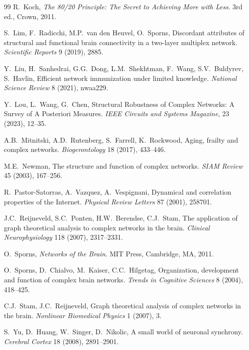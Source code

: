 \documentclass[11pt]{article}
\numberwithin{equation}{section}
\begin{document}
\begin{thebibliography}{99}
R.~Koch,
\newblock \emph{The 80/20 Principle: The Secret to Achieving More with Less}. 
\newblock 3rd ed., Crown, 2011.

S.~Lim, F.~Radicchi, M.P.~van den Heuvel, O.~Sporns,
\newblock Discordant attributes of structural and functional brain connectivity in a two-layer multiplex network.
\newblock \emph{Scientific Reports} 9 (2019), 2885.

Y.~Liu, H.~Sanhedrai, G.G.~Dong, L.M.~Shekhtman, F.~Wang, S.V.~Buldyrev, S.~Havlin,
\newblock Efficient network immunization under limited knowledge.
\newblock \emph{National Science Review} 8 (2021), nwaa229.

Y.~Lou, L.~Wang, G.~Chen,
\newblock Structural Robustness of Complex Networks: A Survey of A Posteriori Measures.
\newblock \emph{IEEE Circuits and Systems Magazine}, 23 (2023), 12--35.

A.B.~Mitnitski, A.D.~Rutenberg, S.~Farrell, K.~Rockwood,
\newblock Aging, frailty and complex networks.
\newblock \emph{Biogerontology} 18 (2017), 433--446.

M.E.~Newman,  
\newblock The structure and function of complex networks. 
\newblock \emph{SIAM Review} 45 (2003), 167--256. 

R.~Pastor-Satorras, A.~Vazquez, A.~Vespignani,
\newblock Dynamical and correlation properties of the Internet.
\newblock \emph{Physical Review Letters} 87 (2001), 258701.

J.C.~Reijneveld, S.C.~Ponten, H.W.~Berendse, C.J.~Stam,
\newblock The application of graph theoretical analysis to complex networks in the brain. 
\newblock \emph{Clinical Neurophysiology} 118 (2007), 2317--2331.

O.~Sporns,
\newblock \emph{Networks of the Brain}.
\newblock MIT Press, Cambridge, MA, 2011.

O.~Sporns, D.~Chialvo, M.~Kaiser, C.C.~Hilgetag,
Organization, development and function of complex brain networks. 
\newblock \emph{Trends in Cognitive Sciences} 8 (2004), 418--425.

C.J.~Stam, J.C.~Reijneveld,
\newblock Graph theoretical analysis of complex networks in the brain. 
\newblock \emph{Nonlinear Biomedical Physics} 1 (2007), 3. 

S.~Yu, D.~Huang, W.~Singer, D.~Nikolic, 
\newblock A small world of neuronal synchrony. 
\newblock \emph{Cerebral Cortex} 18 (2008), 2891--2901.

\end{thebibliography}
\end{document}
